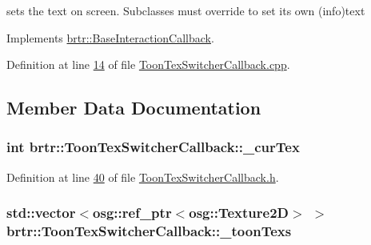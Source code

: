 sets the text on screen. Subclasses must override to set its own (info)text 



Implements \hyperlink{classbrtr_1_1_base_interaction_callback_a0fe57e329f044e21d49041c861435ad8}{brtr\+::\+Base\+Interaction\+Callback}.



Definition at line \hyperlink{_toon_tex_switcher_callback_8cpp_source_l00014}{14} of file \hyperlink{_toon_tex_switcher_callback_8cpp_source}{Toon\+Tex\+Switcher\+Callback.\+cpp}.



\subsection{Member Data Documentation}
\hypertarget{classbrtr_1_1_toon_tex_switcher_callback_a58030dcd246f0f2c168965ca087cfa17}{
\subsubsection[{\+\_\+cur\+Tex}]{\setlength{\rightskip}{0pt plus 5cm}int brtr\+::\+Toon\+Tex\+Switcher\+Callback\+::\+\_\+cur\+Tex\hspace{0.3cm}{\ttfamily [private]}}}\label{classbrtr_1_1_toon_tex_switcher_callback_a58030dcd246f0f2c168965ca087cfa17}


Definition at line \hyperlink{_toon_tex_switcher_callback_8h_source_l00040}{40} of file \hyperlink{_toon_tex_switcher_callback_8h_source}{Toon\+Tex\+Switcher\+Callback.\+h}.

\hypertarget{classbrtr_1_1_toon_tex_switcher_callback_a96cbd2a83f9ed21efde9d086c34e6d5e}{
\subsubsection[{\+\_\+toon\+Texs}]{\setlength{\rightskip}{0pt plus 5cm}std\+::vector$<$osg\+::ref\+\_\+ptr$<$osg\+::\+Texture2\+D$>$ $>$ brtr\+::\+Toon\+Tex\+Switcher\+Callback\+::\+\_\+toon\+Texs\hspace{0.3cm}{\ttfamily [private]}}}\label{classbrtr_1_1_toon_tex_switcher_callback_a96cbd2a83f9ed21efde9d086c34e6d5e}


